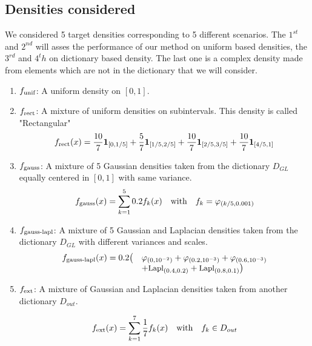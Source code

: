 \subsection{Densities considered}
We considered 5 target densities corresponding to 5 different scenarios. The $1^{st}$ and $2^{nd}$ will asses the performance of our method on uniform based densities, the $3^{rd}$ and $4^th$ on dictionary based density. The last one is a complex density made from elements which are not in the dictionary that we will consider.
\begin{enumerate}
\item{$f_{\textnormal{unif}}$:} A uniform density on $[0,1]$.
\item{$f_{\textnormal{rect}}$:} A mixture of uniform densities on subintervals. This density is called "Rectangular"
\begin{equation}
    f_{\textnormal{rect}}(x)=\frac{10}{7}\b1_{[0,1/5]}+\frac{5}{7}\b1_{[1/5,2/5]}+
    \frac{10}{7}\b1_{[2/5,3/5]}+\frac{10}{7}\b1_{[4/5,1]}
\end{equation}
\item{$f_{\textnormal{gauss}}$:} A mixture of 5 Gaussian densities taken from the dictionary $D_{GL}$ equally centered in $[0,1]$ with same variance.
\begin{equation}
    f_{\textnormal{gauss}}(x)=\sum_{k=1}^5 0.2f_{k}(x) \quad \text{with}\quad f_k=\varphi_{(k/5,0.001)}
\end{equation}

\item{$f_{\textnormal{gauss-lapl}}$:} A mixture of 5 Gaussian and Laplacian densities taken from the dictionary $D_{GL}$ with different variances and scales.
\begin{equation}
\begin{array}{ll}
f_{\textnormal{gauss-lapl}}(x)=0.2\big(&\varphi_{(0 ,10^{-2})} + \varphi_{(0.2,10^{-3})}+\varphi_{(0.6,10^{-3})}\\
    &+\text{\small Lapl}_{(0.4,0.2)}+\text{\small Lapl}_{(0.8,0.1)} \big)
\end{array}
\end{equation}


\item{$f_{\textnormal{ext}}$:} A mixture of Gaussian and Laplacian densities taken from another dictionary $D_{out}$.

\begin{equation}
    f_{\textnormal{ext}}(x)=\sum_{k=1}^7 \frac{1}{7}f_{k}(x) \quad \text{with}\quad f_k\in D_{out}
\end{equation}
\end{enumerate}
